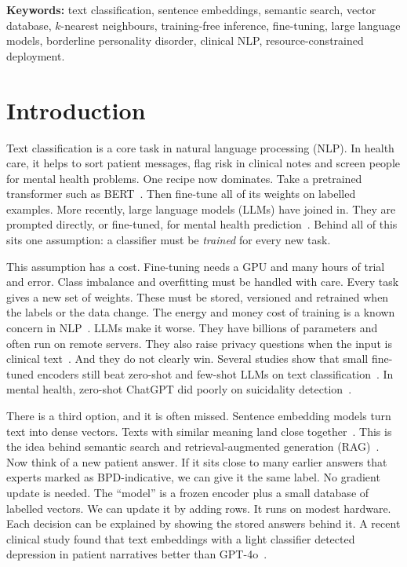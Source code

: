 \documentclass[11pt]{article}
\begin{document}
\noindent\textbf{Keywords:} text classification, sentence embeddings, semantic search, vector
database, $k$-nearest neighbours, training-free inference, fine-tuning, large language models,
borderline personality disorder, clinical NLP, resource-constrained deployment.

\section{Introduction}\label{sec:intro}

Text classification is a core task in natural language processing (NLP). In health care, it helps
to sort patient messages, flag risk in clinical notes and screen people for mental health problems.
One recipe now dominates. Take a pretrained transformer such as BERT~\cite{devlin2019bert}. Then
fine-tune all of its weights on labelled examples. More recently, large language models (LLMs) have
joined in. They are prompted directly, or fine-tuned, for mental health
prediction~\cite{yang2024mentallama,xu2024mental,guo2024llmreview}. Behind all of this sits one
assumption: a classifier must be \emph{trained} for every new task.

This assumption has a cost. Fine-tuning needs a GPU and many hours of trial and error. Class
imbalance and overfitting must be handled with care. Every task gives a new set of weights. These
must be stored, versioned and retrained when the labels or the data change. The energy and money
cost of training is a known concern in NLP~\cite{strubell2019energy,schwartz2020green}. LLMs make
it worse. They have billions of parameters and often run on remote servers. They also raise privacy
questions when the input is clinical text~\cite{guo2024llmreview}. And they do not clearly win.
Several studies show that small fine-tuned encoders still beat zero-shot and few-shot LLMs on text
classification~\cite{bucher2024finetuned,edwards2024icl}. In mental health, zero-shot ChatGPT did
poorly on suicidality detection~\cite{lamichhane2023chatgpt}.

There is a third option, and it is often missed. Sentence embedding models turn text into dense
vectors. Texts with similar meaning land close together~\cite{reimers2019sbert,xiao2023cpack,muennighoff2023mteb}.
This is the idea behind semantic search and retrieval-augmented generation
(RAG)~\cite{karpukhin2020dpr,lewis2020rag}. Now think of a new patient answer. If it sits close to
many earlier answers that experts marked as BPD-indicative, we can give it the same label. No
gradient update is needed. The ``model'' is a frozen encoder plus a small database of labelled
vectors. We can update it by adding rows. It runs on modest hardware. Each decision can be explained
by showing the stored answers behind it. A recent clinical study found that text embeddings with a
light classifier detected depression in patient narratives better than GPT-4o~\cite{lho2025jama}.
\end{document}
